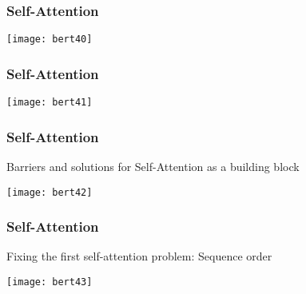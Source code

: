 





\begin{frame}[fragile]\frametitle{Self-Attention}


\begin{center}
\texttt{[image: bert40]}
\end{center}	

 
\end{frame}

\begin{frame}[fragile]\frametitle{Self-Attention}


\begin{center}
\texttt{[image: bert41]}
\end{center}	

 
\end{frame}

\begin{frame}[fragile]\frametitle{Self-Attention}

Barriers and solutions for Self-Attention as a building block

\begin{center}
\texttt{[image: bert42]}
\end{center}	

 
\end{frame}

\begin{frame}[fragile]\frametitle{Self-Attention}

Fixing the first self-attention problem: Sequence order

\begin{center}
\texttt{[image: bert43]}
\end{center}	

 
\end{frame}

